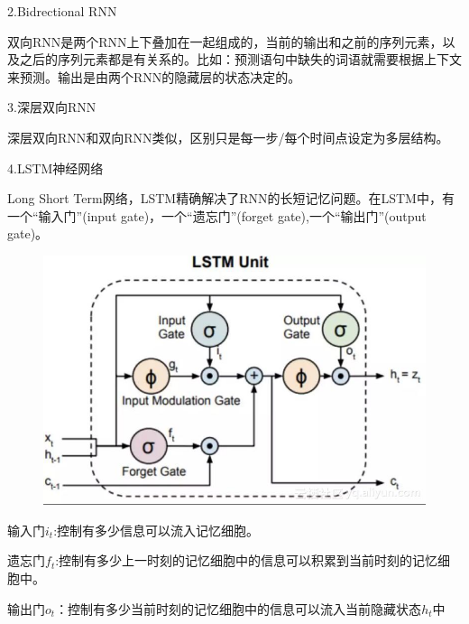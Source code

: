\documentclass[openbib]{article}
\begin{document}
\begin{center}
	2.Bidrectional RNN
\end{center}

双向RNN是两个RNN上下叠加在一起组成的，当前的输出和之前的序列元素，以及之后的序列元素都是有关系的。比如：预测语句中缺失的词语就需要根据上下文来预测。输出是由两个RNN的隐藏层的状态决定的。

\begin{center}
	3.深层双向RNN
\end{center}

深层双向RNN和双向RNN类似，区别只是每一步/每个时间点设定为多层结构。

\begin{center}
	4.LSTM神经网络
\end{center}

Long Short Term网络，LSTM精确解决了RNN的长短记忆问题。在LSTM中，有一个“输入门”(input gate)，一个“遗忘门”(forget gate),一个“输出门”(output gate)。
\begin{figure}[htbp]
	\centering
	\includegraphics[scale=0.3]{LSTM神经网络结构图}
\end{figure}

输入门$i_t$:控制有多少信息可以流入记忆细胞。

遗忘门$f_t$:控制有多少上一时刻的记忆细胞中的信息可以积累到当前时刻的记忆细胞中。

输出门$o_t$：控制有多少当前时刻的记忆细胞中的信息可以流入当前隐藏状态$h_t$中
\end{document}
